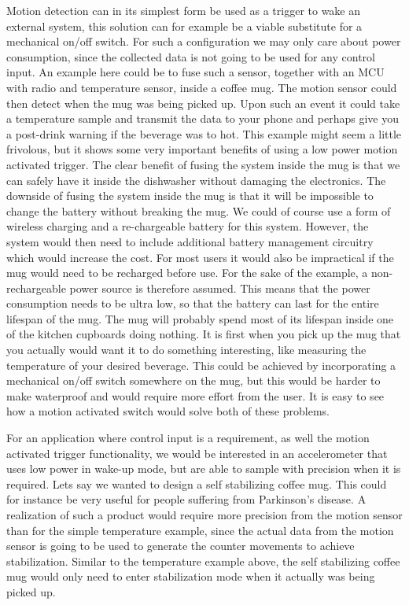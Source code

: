 Motion detection can in its simplest form be used as a trigger to wake an external system, this solution can for example be a viable substitute for a mechanical on/off switch. For such a configuration we may only care about power consumption, since the collected data is not going to be used for any control input. An example here could be to fuse such a sensor, together with an MCU with radio and temperature sensor, inside a coffee mug. The motion sensor could then detect when the mug was being picked up. Upon such an event it could take a temperature sample and transmit the data to your phone and perhaps give you a post-drink warning if the beverage was to hot. This example might seem a little frivolous, but it shows some very important benefits of using a low power motion activated trigger. The clear benefit of fusing the system inside the mug is that we can safely have it inside the dishwasher without damaging the electronics. The downside of fusing the system inside the mug is that it will be impossible to change the battery without breaking the mug. We could of course use a form of wireless charging and a re-chargeable battery for this system. However, the system would then need to include additional battery management circuitry which would increase the cost. For most users it would also be impractical if the mug would need to be recharged before use. For the sake of the example, a non-rechargeable power source is therefore assumed. This means that the power consumption needs to be ultra low, so that the battery can last for the entire lifespan of the mug. The mug will probably spend most of its lifespan inside one of the kitchen cupboards doing nothing. It is first when you pick up the mug that you actually would want it to do something interesting, like measuring the temperature of your desired beverage. This could be achieved by incorporating a mechanical on/off switch somewhere on the mug, but this would be harder to make waterproof and would require more effort from the user. It is easy to see how a motion activated switch would solve both of these problems. 

For an application where control input is a requirement, as well the motion activated trigger functionality, we would be interested in an accelerometer that uses low power in wake-up mode, but are able to sample with precision when it is required. Lets say we wanted to design a self stabilizing coffee mug. This could for instance be very useful for people suffering from Parkinson's disease. A realization of such a product would require more precision from the motion sensor than for the simple temperature example, since the actual data from the motion sensor is going to be used to generate the counter movements to achieve stabilization. Similar to the temperature example above, the self stabilizing coffee mug would only need to enter stabilization mode when it actually was being picked up.

